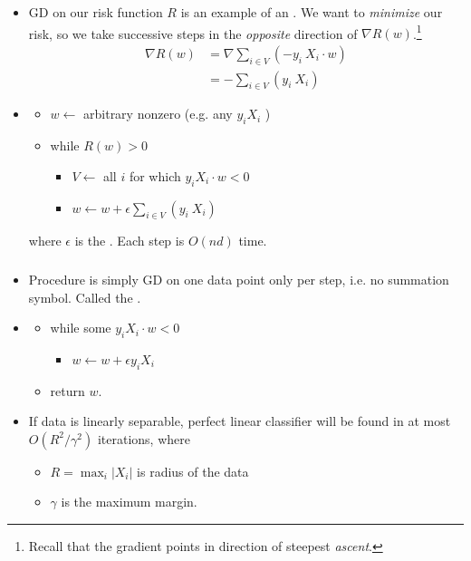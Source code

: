 \documentclass[12pt]{article}
\begin{document}
\subsubsection{}
\begin{itemize}
	\item GD on our risk function $R$ is an example of an . We want to \textit{minimize} our risk, so we take successive steps in the \textit{opposite} direction of $\nabla R(w)$.\footnote{Recall that the gradient points in direction of steepest \emph{ascent}.}
	\begin{align}
	\nabla R(w) &= \nabla \sum_{i \in V} ( -y_i ~ X_i \cdot w) \\
	&=  -\sum_{i \in V} (y_i ~ X_i )
	\end{align}
	\item {}
	\begin{itemize}
		\item $w \leftarrow $ arbitrary nonzero (e.g. any $y_i X_i$ )
		\item while $R(w) > 0$
		\begin{itemize}
			\item $V \leftarrow $ all $i$ for which $y_i X_i \cdot w < 0$
			\item $w \leftarrow w + \epsilon \sum_{i \in V} (y_i ~ X_i )$
		\end{itemize}
	\end{itemize}
	where $\epsilon$ is the . Each step is $O(nd)$ time.
\end{itemize}

\subsubsection{}
\begin{itemize}
	\item Procedure is simply GD on one data point only per step, i.e. no summation symbol. Called the .
	\item {}
	\begin{itemize}
		\item while some $y_i X_i \cdot w < 0$
		\begin{itemize}
			\item $w \leftarrow w + \epsilon y_i X_i$
		\end{itemize}
		\item return $w$.
	\end{itemize}
	\item {} If data is linearly separable, perfect linear classifier will be found in at most $O(R^2 / \gamma^2)$ iterations, where
	\begin{itemize}
		\item $R = \max_i |X_i|$ is radius of the data
		\item $\gamma$ is the maximum margin.
	\end{itemize}
\end{itemize}
\end{document}
